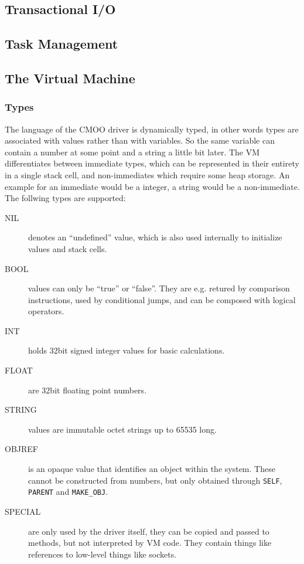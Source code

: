 \documentclass[12pt,a4paper]{article}
\begin{document}
\subsection{Transactional I/O}\label{sec:transactional_io}

\subsection{Task Management}\label{sec:task_mgmt}

\subsection{The Virtual Machine}\label{sec:virtual_machine}

\subsubsection{Types}\label{sec:types}

The language of the CMOO driver is dynamically typed, in other words types are associated with values rather than with variables. So the same variable can contain a number at some point and a string a little bit later. The VM differentiates between immediate types, which can be represented in their entirety in a single stack cell, and non-immediates which require some heap storage. An example for an immediate would be a integer, a string would be a non-immediate. The follwing types are supported:

\begin{description}
\item[NIL] denotes an ``undefined'' value, which is also used internally to initialize values and stack cells.  
\item[BOOL] values can only be ``true'' or ``false''. They are e.g. retured by comparison instructions, used by conditional jumps, and can be composed with logical operators.
\item[INT] holds 32bit signed integer values for basic calculations.
\item[FLOAT] are 32bit floating point numbers.
\item[STRING] values are immutable octet strings up to 65535 long.  
\item[OBJREF] is an opaque value that identifies an object within the system. These cannot be constructed from numbers, but only obtained through \verb|SELF|, \verb|PARENT| and \verb|MAKE_OBJ|. 
\item[SPECIAL] are only used by the driver itself, they can be copied and passed to methods, but not interpreted by VM code. They contain things like references to low-level things like sockets.
\end{description}
\end{document}
